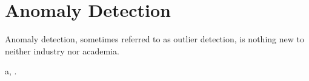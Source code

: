 \section{Anomaly Detection}
\label{relwork:anomaly}


Anomaly detection, sometimes referred to as outlier detection, is nothing new to neither industry nor academia. 


a, \cite{10.14778/3538598.3538602} \cite{10.1145/3444690}.